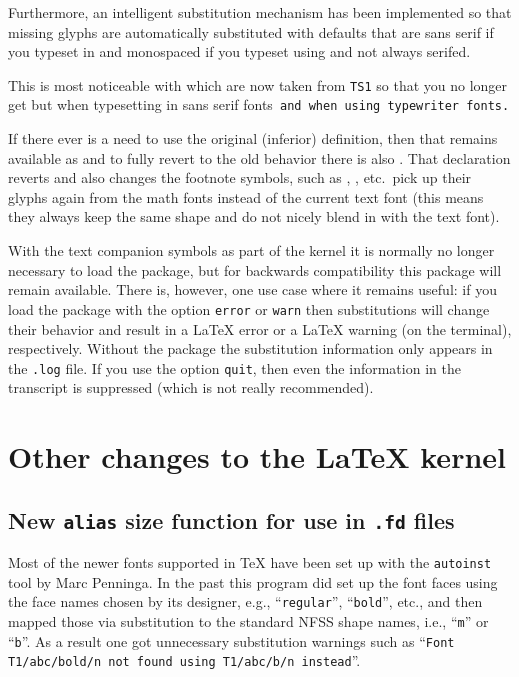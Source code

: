 \documentclass{ltnews}
\begin{document}
Furthermore, an intelligent substitution mechanism has been
implemented so that missing glyphs are automatically substituted with
defaults that are sans serif if you typeset in  and
monospaced if you typeset using  and not always serifed.


\textsf{This is most noticeable with  which are now
  taken from \texttt{TS1} so that you no longer get
  \textrm{} but  when typesetting
  in sans serif fonts}\texttt{ and  when using
  typewriter fonts.}

If there ever is a need to use the original (inferior) definition,
then that remains available as  and to fully
revert to the old behavior there is also
. That declaration reverts 
and also changes the footnote symbols, such as ,
, etc.\ pick up their glyphs again from the math
fonts instead of the current text font (this means they always keep
the same shape and do not nicely blend in with the text font).

With the text companion symbols as part of the kernel it is normally
no longer necessary to load the  package, but for
backwards compatibility this package will remain available.  There is,
however, one use case where it remains useful: if you load the package
with the option \texttt{error} or \texttt{warn} then substitutions
will change their behavior and result in a \LaTeX{} error or a
\LaTeX{} warning (on the terminal), respectively. Without the package
the substitution information only appears in the \texttt{.log}
file. If you use the option \texttt{quit}, then even the information in
the transcript is suppressed (which is not really recommended).

\section{Other changes to the \LaTeX{} kernel}

\subsection{New \texttt{alias} size function for use in \texttt{.fd} files}

Most of the newer fonts supported in \TeX{} have been set up with the
\texttt{autoinst} tool by Marc Penninga. In the past this program did
set up the font faces using the face names chosen by its designer,
e.g., \enquote{\texttt{regular}}, \enquote{\texttt{bold}}, etc., and
then mapped those via substitution to the standard NFSS shape names,
i.e., \enquote{\texttt{m}} or \enquote{\texttt{b}}. As a result one
got unnecessary substitution warnings such as \enquote{\texttt{Font
    T1/abc/bold/n not found using T1/abc/b/n instead}}.
\end{document}
